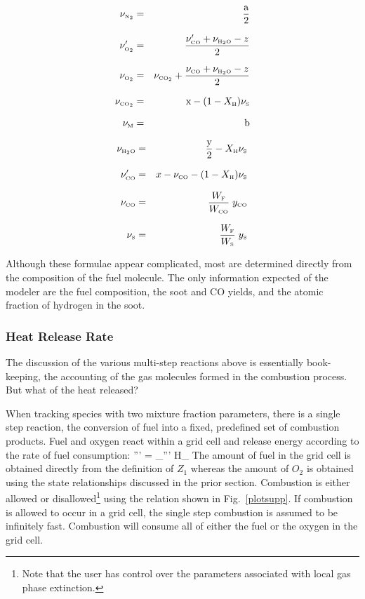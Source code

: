 \documentclass[11pt]{book}
\begin{document}
\parbox{2.5in}{
\begin{eqnarray*} \nu_{\tiny \hbox{N}_2}  &=& \frac{\hbox{a}}{2}\\*[.1in]
                  \nu_{\tiny \hbox{O}_2}' &=& \frac{\nu_{\tiny \hbox{CO}}'+\nu_{\tiny \hbox{H}_2\hbox{O}}-z}{2}\\*[.1in]
                  \nu_{\tiny \hbox{O}_2}  &=& \nu_{\tiny \hbox{CO}_2} + \frac{\nu_{\tiny \hbox{CO}}+\nu_{\tiny \hbox{H}_2\hbox{O}}-z}{2}\\*[.1in]
                  \nu_{\tiny \hbox{CO}_2} &=& \hbox{x} - (1-X_{\tiny \hbox{H}}) \nu_{\tiny \hbox{S}} \\*[.1in]
                  \nu_{\tiny \hbox{M}}     &=& \hbox{b} \end{eqnarray*} }
\hfill \parbox{3.5in}{\begin{eqnarray}
                  \nu_{\tiny \hbox{H}_2\hbox{O}} &=& \frac{\hbox{y}}{2}- X_{\tiny \hbox{H}} \nu_{\tiny \hbox{S}}\\*[.1in]
                  \nu_{\tiny \hbox{CO}}'   &=& x - \nu_{\tiny \hbox{CO}} - (1-X_{\tiny \hbox{H}}) \nu_{\tiny \hbox{S}} \\*[.1in]
                  \nu_{\tiny \hbox{CO}}    &=& \frac{W_{\tiny \hbox{F}}}{W_{\tiny \hbox{CO}}} \; y_{\tiny \hbox{CO}} \\*[.1in]
                  \nu_{\tiny \hbox{S}}    &=& \frac{W_{\tiny \hbox{F}}}{W_{\tiny \hbox{S}}} \; y_{\tiny \hbox{S}}
\end{eqnarray} }
Although these formulae appear complicated, most are determined directly from the composition of the fuel molecule. The only information
expected of the modeler are the fuel composition, the soot and CO yields, and the atomic fraction of hydrogen in the soot.


\subsubsection{Heat Release Rate}

The discussion of the various multi-step reactions above is essentially book-keeping, the accounting of the gas
molecules formed in the combustion process. But what of the heat released?

When tracking species with two mixture fraction parameters, there is a single step reaction, the conversion of fuel into a
fixed, predefined set of combustion products.  Fuel and oxygen react within a grid cell and release energy according to
the rate of fuel consumption:
\be \dq''' = \dm_\F''' \Delta H_{\F} \ee
The amount of fuel in the grid cell is obtained directly from the definition of $Z_1$ whereas the amount of $O_2$ is
obtained using the state relationships discussed in the prior section.  Combustion is either allowed or
disallowed\footnote{Note that the user has control over the parameters associated with local gas phase extinction.}
using the relation shown in Fig.~\ref{plotsupp}.
If combustion is allowed to occur in a grid
cell, the single step combustion is assumed to be
infinitely fast.  Combustion will consume all of either the fuel or the oxygen in the grid cell.
\end{document}
